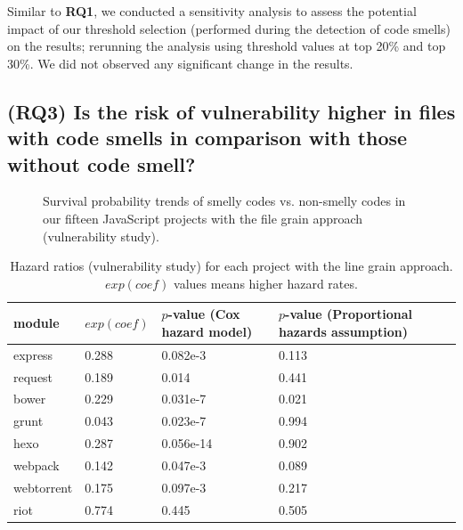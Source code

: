 Similar to \textbf{RQ1}, we conducted a sensitivity analysis to assess the potential impact of our threshold selection (performed during the detection of code smells) on the results; rerunning the analysis using threshold values at top 20\% and top 30\%. We did not observed any significant change in the results.

{\color{blue}
\subsection*{(RQ3) Is the risk of vulnerability higher in files with code smells in comparison with those without code smell?}

\begin{figure}[!htbp]
	\centering%
	\caption{Survival probability trends of smelly codes vs. non-smelly codes in our fifteen JavaScript projects with the file grain approach (vulnerability study).\vspace{-10pt}}
	\label{rq3}
\end{figure}

\begin{table}[t]
	\centering
	\scriptsize
	\caption{Hazard ratios (vulnerability study) for each project with the line grain approach. $exp(coef)$ values means higher hazard rates.}
	\label{vulnlinegrain}
	\begin{tabular}{l|l|l|m{4cm}}
		\hline
		module & $exp(coef)$ & $p$-value (Cox hazard model) & $p$-value (Proportional hazards assumption)     \\ \hline
		express  & 0.288 & 0.082e-3 & 0.113 \\ \hline
		request  & 0.189 & 0.014 & 0.441 \\ \hline
		bower	 & 0.229 & 0.031e-7 & 0.021 \\ \hline
		grunt    & 0.043 & 0.023e-7 & 0.994 \\ \hline
		hexo	 & 0.287 & 0.056e-14 & 0.902 \\ \hline
		webpack	 & 0.142 & 0.047e-3 & 0.089 \\ \hline
		webtorrent & 0.175 & 0.097e-3 & 0.217 \\ \hline
		riot	 & 0.774 & 0.445 & 0.505 \\ \hline
	\end{tabular}


\end{table}}
